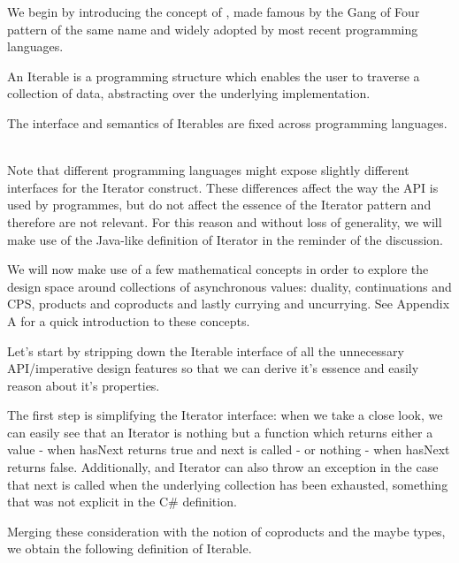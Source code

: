 We begin by introducing the concept of , made famous by the Gang of Four pattern of the same name and widely adopted by most recent programming languages. 

An Iterable is a programming structure which enables the user to traverse a collection of data, abstracting over the underlying implementation.

The interface and semantics of Iterables are fixed across programming languages.\\


\\

Note that different programming languages might expose slightly different interfaces for the Iterator construct. These differences  affect the way the API is used by programmes, but do not affect the essence of the Iterator pattern and therefore are not relevant. For this reason and without loss of generality, we will make use of the Java-like definition of Iterator in the reminder of the discussion.

We will now make use of a few mathematical concepts in order to explore the design space around collections of asynchronous values: duality, continuations and CPS, products and coproducts and lastly currying and uncurrying. See Appendix A for a quick introduction to these concepts.

Let's start by stripping down the Iterable interface of all the unnecessary API/imperative design features so that we can derive it's essence and easily reason about it's properties.	

The first step is simplifying the Iterator interface: when we take a close look, we can easily see that an Iterator is nothing but a function which returns either a value - when hasNext returns true and next is called - or nothing - when hasNext returns false. Additionally, and Iterator can also throw an exception in the case that next is called when the underlying collection has been exhausted, something that was not explicit in the C\# definition.

Merging these consideration with the notion of coproducts and the maybe types, we obtain the following definition of Iterable.\\

\\

